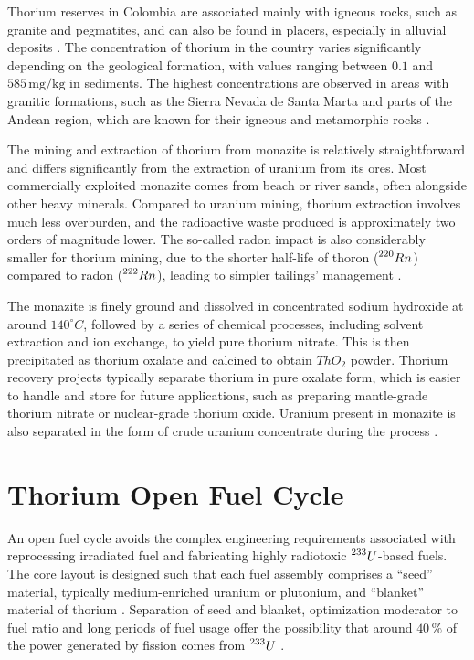 Thorium reserves in Colombia are associated mainly with igneous rocks, such as granite and pegmatites, and can also be found in placers, especially in alluvial deposits \cite{Th_Colombia}. The concentration of thorium in the country varies significantly depending on the geological formation, with values ranging between \(0.1\) and \(585 \, \text{mg}/\text{kg}\) in sediments. The highest concentrations are observed in areas with granitic formations, such as the Sierra Nevada de Santa Marta and parts of the Andean region, which are known for their igneous and metamorphic rocks \cite{Th_Colombia}. 

The mining and extraction of thorium from monazite is relatively straightforward and differs significantly from the extraction of uranium from its ores. Most commercially exploited monazite comes from beach or river sands, often alongside other heavy minerals. Compared to uranium mining, thorium extraction involves much less overburden, and the radioactive waste produced is approximately two orders of magnitude lower. The so-called radon impact is also considerably smaller for thorium mining, due to the shorter half-life of thoron (\(\prescript{220}{}{Rn}\)) compared to radon (\(\prescript{222}{}{Rn}\)), leading to simpler tailings' management \cite{IAEA_Th_Potential,Thoron}.

The monazite is finely ground and dissolved in concentrated sodium hydroxide at around \(140^{\circ}C\), followed by a series of chemical processes, including solvent extraction and ion exchange, to yield pure thorium nitrate. This is then precipitated as thorium oxalate and calcined to obtain \(ThO_2\) powder. Thorium recovery projects typically separate thorium in pure oxalate form, which is easier to handle and store for future applications, such as preparing mantle-grade thorium nitrate or nuclear-grade thorium oxide. Uranium present in monazite is also separated in the form of crude uranium concentrate during the process \cite{IAEA_Th_Potential}.

\section{Thorium Open Fuel Cycle}

An open fuel cycle avoids the complex engineering requirements associated with reprocessing irradiated fuel and fabricating highly radiotoxic \(\prescript{233}{}{U}\)-based fuels. The core layout is designed such that each fuel assembly comprises a ``seed'' material, typically medium-enriched uranium or plutonium, and ``blanket'' material of thorium \cite{IAEA_Th_Potential}. Separation of seed and blanket, optimization moderator to fuel ratio and long periods of fuel usage offer the possibility that around \(40 \, \%\) of the power generated by fission comes from \(\prescript{233}{}{U}\) \cite{IAEA_Th_Potential}.

